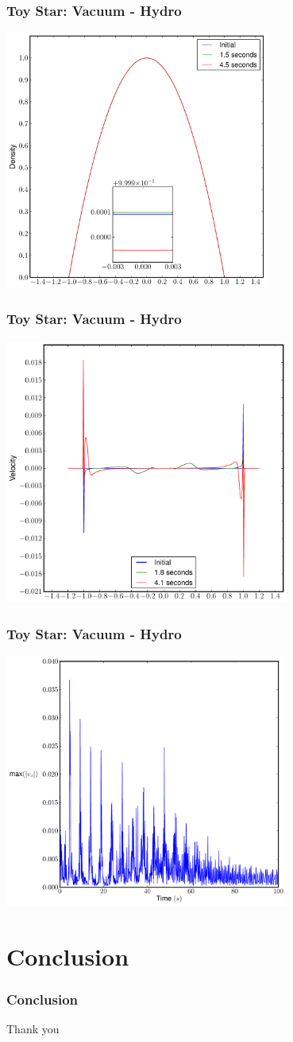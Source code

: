 \documentclass{beamer}
\begin{document}
\begin{frame}
\frametitle{Toy Star: Vacuum - Hydro}
\centering
\includegraphics[width=0.65\textwidth]{../images/toy_density}
\end{frame}
\begin{frame}
\frametitle{Toy Star: Vacuum - Hydro}
\centering
\includegraphics[width=0.7\textwidth]{../images/toy_velocity}
\end{frame}
\begin{frame}
\frametitle{Toy Star: Vacuum - Hydro}
\centering
\includegraphics[width=0.7\textwidth]{../images/toy_max_vx}
\end{frame}

\section{Conclusion}
\begin{frame}
\frametitle{Conclusion}
Thank you
\end{frame}
\end{document}
